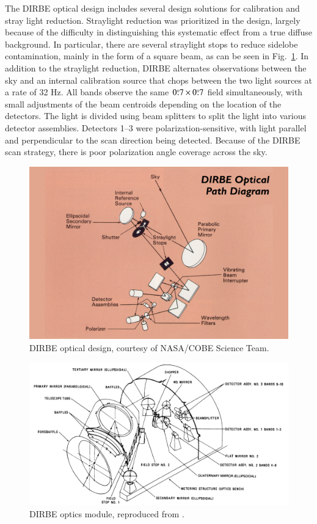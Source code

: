 \documentclass{aa}
\begin{document}
The DIRBE optical design includes several design solutions for calibration and stray light reduction. Straylight reduction was prioritized in the design, largely because of the difficulty in distinguishing this systematic effect from a true diffuse background. In particular, there are several straylight stops to reduce sidelobe contamination, mainly in the form of a square beam, as can be seen in Fig.~\ref{fig:optics}. In addition to the straylight reduction, DIRBE alternates observations between the sky and an internal calibration source that chops between the two light sources at a rate of 32 Hz.
All bands observe the same $0\overset{\circ}{.}7\times0\overset{\circ}{.}7$  field simultaneously, with small adjustments of the beam centroids depending on the location of the detectors. The light is divided using beam splitters to split the light into various detector assemblies. Detectors 1--3 were polarization-sensitive, with light parallel and perpendicular to the scan direction being detected. Because of the DIRBE scan strategy, there is poor polarization angle coverage across the sky.

\begin{figure}
	\centering
	\includegraphics[width=\linewidth]{figs/cobeslide04.jpg}
	\caption{DIRBE optical design, courtesy of NASA/COBE Science Team.
	}
	\label{fig:optics}
\end{figure}

\begin{figure}
	\centering
	\includegraphics[width=\linewidth]{figs/DIRBE_optics.png}
	\caption{DIRBE optics module, reproduced from \cite{magner87}.
	}
	\label{fig:optics_model}
\end{figure}
\end{document}
